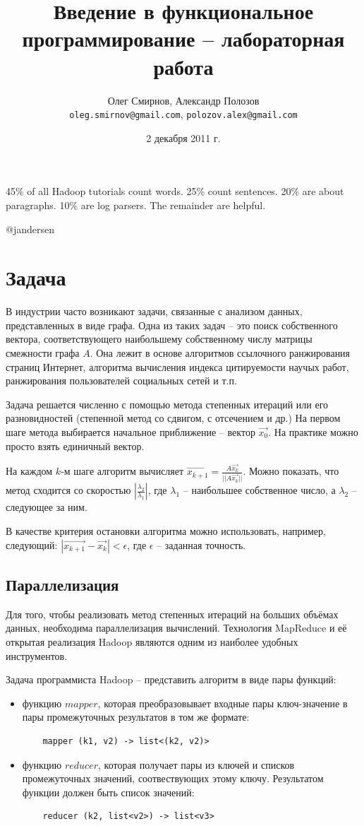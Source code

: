 \documentclass[a4paper,11pt]{article}
\author{Олег Смирнов, Александр Полозов \\
\texttt{oleg.smirnov@gmail.com}, \texttt{polozov.alex@gmail.com}}
\date{2 декабря 2011 г.}
\title{Введение в функциональное программирование -- лабораторная работа \No 2}
\begin{document}
\epigraph{45\% of all Hadoop tutorials count words. 25\% count sentences.
20\% are about paragraphs. 10\% are log parsers. The remainder are 
helpful.}{@jandersen}

\section{Задача}
В индустрии часто возникают задачи, связанные с анализом данных, представленных
в виде графа. Одна из таких задач -- это поиск собственного вектора,
соответствующего наибольшему собственному числу матрицы смежности графа $A$.
Она лежит в основе алгоритмов ссылочного ранжирования страниц Интернет, 
алгоритма вычисления индекса цитируемости научых работ, ранжирования
пользователей социальных сетей и т.п.

Задача решается численно с помощью метода степенных итераций или его
разновидностей (степенной метод со сдвигом, с отсечением и др.) На первом шаге
метода выбирается начальное приближение -- вектор $\vec{x_0}$. На практике
можно просто взять единичный вектор.

На каждом $k$-м шаге алгоритм вычисляет $\vec{x_{k+1}} = 
\frac{A \vec{x_k}}{||A \vec{x_k}||}$. Можно показать, что метод сходится
со скоростью $|\frac{\lambda_2}{\lambda_1}|$, где $\lambda_1$ -- наибольшее
собственное число, а $\lambda_2$ -- следующее за ним.

В качестве критерия остановки алгоритма можно использовать, например,
следующий: $|\vec{x_{k+1}} - \vec{x_k}| < \epsilon$, где $\epsilon$ --
заданная точность.

\subsection{Параллелизация}
Для того, чтобы реализовать метод степенных итераций на больших объёмах
данных, необходима параллелизация вычислений. Технология MapReduce и
её открытая реализация Hadoop являются одним из наиболее удобных 
инструментов.

Задача программиста Hadoop -- представить алгоритм в виде пары функций:
\begin{itemize}
\item функцию $mapper$, которая преобразовывает входные пары ключ-значение
  в пары промежуточных результатов в том же формате:
  \begin{lstlisting}
    mapper (k1, v2) -> list<(k2, v2)>
  \end{lstlisting}
\item функцию $reducer$, которая получает пары из ключей и списков 
  промежуточных значений, соотвествующих этому ключу. Результатом функции
  должен быть список значений:
  \begin{lstlisting}
    reducer (k2, list<v2>) -> list<v3>
  \end{lstlisting}
\end{itemize}
\end{document}
